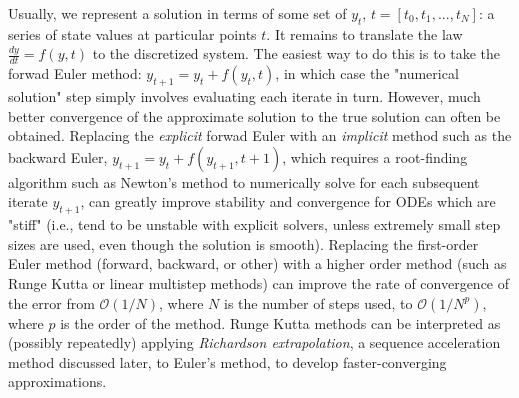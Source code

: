 \documentclass{puthesis}
\begin{document}
Usually, we represent a solution in terms of some set of $y_t$, $t = [t_0, t_1, ..., t_N]$: a series
of state values at particular points $t$.
It remains to translate the law $\frac{dy}{dt} = f(y, t)$ to the
discretized system.
The easiest way to do this is to take the forwad Euler method: $y_{t+1} = y_t + f(y_t, t)$, in which case the "numerical solution" step
simply involves evaluating each iterate in turn.
However, much better convergence of the approximate solution to the true solution can often be obtained.
Replacing the \emph{explicit} forwad Euler with an \emph{implicit} method such as the backward Euler, $y_{t+1} = y_t + f(y_{t+1}, t+1)$,
which requires a root-finding algorithm such as Newton's method to numerically solve for each subsequent iterate
$y_{t+1}$, can greatly improve stability and convergence for ODEs
which are "stiff" (i.e., tend to be unstable with explicit solvers,
unless extremely small step sizes are used, even though the solution is
smooth).
Replacing the first-order Euler method (forward, backward, or other)
with a higher order method (such as Runge Kutta or linear multistep methods)
can improve the rate of convergence of the error from $\mathcal{O}(1/N)$,
where $N$ is the number of steps used, to $\mathcal{O}(1/N^p)$, where $p$ is the order of the method.
Runge Kutta methods can be interpreted as (possibly repeatedly) applying \emph{Richardson extrapolation},
a sequence acceleration method discussed later, to Euler's method,
to develop faster-converging approximations.
\end{document}
